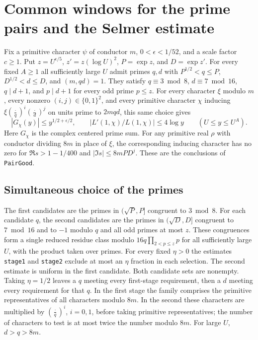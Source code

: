 \section{Common windows for the prime pairs and the Selmer estimate}
\label{sec:rh-common-windows}

Fix a primitive character $\psi$ of conductor $m$, $0<\epsilon<1/52$,
and a scale factor $c\ge1$. Put $z=U^{\epsilon/5}$,
$z'=z(\log U)^2$, $P=\exp z$, and $D=\exp z'$. For every fixed $A\ge1$
all sufficiently large $U$ admit primes $q,d$ with $P^{1/2}<q\le P$,
$D^{1/2}<d\le D$, and $(m,qd)=1$. They satisfy $q\equiv3\bmod 8$,
$d\equiv7\bmod16$, $q\mid d+1$, and $p\mid d+1$ for every odd prime
$p\le z$. For every character $\xi$ modulo $m$, every nonzero
$(i,j)\in\{0,1\}^2$, and every primitive character $\chi$ inducing
$\xi(\frac{\cdot}{q})^i(\frac{\cdot}{d})^j$ on units prime to $2mqd$,
this same choice gives
\[
 |G_\chi(y)|\le y^{1/2+\epsilon/2},\qquad
 |L'(1,\chi)/L(1,\chi)|\le4\log y\qquad (U\le y\le U^A).
\]
Here $G_\chi$ is the complex centered prime sum. For any primitive real
$\rho$ with conductor dividing $8m$ in place of $\xi$, the corresponding
inducing character has no zero for $\Re s>1-1/400$ and
$|\Im s|\le8mPD^j$. These are the conclusions of \texttt{PairGood}.

\subsection{Simultaneous choice of the primes}

The first candidates are the primes in $(\sqrt P,P]$ congruent to
$3\bmod8$. For each candidate $q$, the second candidates are the primes
in $(\sqrt D,D]$ congruent to $7\bmod16$ and to $-1$ modulo $q$ and
all odd primes at most $z$. These congruences form a single reduced
residue class modulo $16q\prod_{2<p\le z}p$ for all sufficiently
large $U$, with the product taken over primes. For every fixed
$\eta>0$ the estimates \texttt{stage1} and \texttt{stage2} exclude
at most an $\eta$ fraction in each selection. The second estimate is
uniform in the first candidate. Both candidate sets are nonempty.
Taking $\eta=1/2$ leaves a $q$ meeting every first-stage requirement,
then a $d$ meeting every requirement for that $q$. In the first stage
the family comprises the primitive representatives of all characters
modulo $8m$. In the second these characters are multiplied by
$(\frac{\cdot}{q})^i$, $i=0,1$, before taking primitive representatives;
the number of characters to test is at most twice the number modulo
$8m$. For large $U$, $d>q>8m$.

